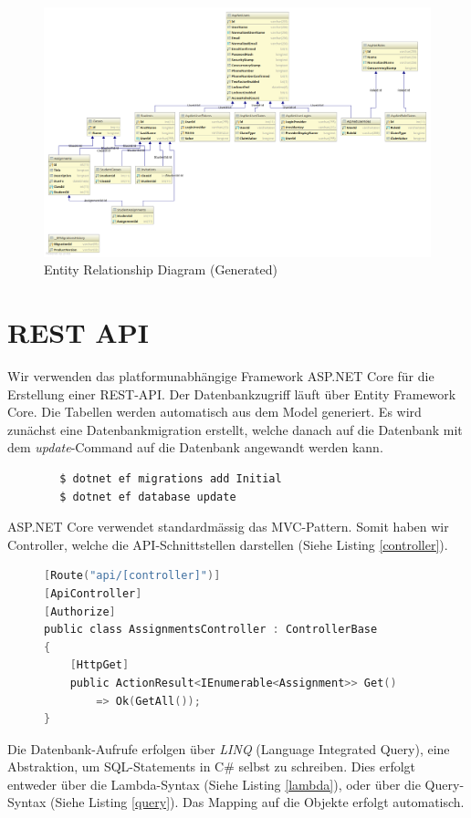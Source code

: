 \documentclass[a4paper, titlepage]{article}
\begin{document}
    \begin{figure}
        \includegraphics[width=\textwidth]{uml2}
        \caption{Entity Relationship Diagram (Generated)}
    \end{figure}

    \section{REST API}
    Wir verwenden das platformunabhängige Framework ASP.NET Core für die Erstellung einer REST-API.
    Der Datenbankzugriff läuft über Entity Framework Core. Die Tabellen werden automatisch aus dem Model
    generiert. Es wird zunächst eine Datenbankmigration erstellt, welche danach auf die Datenbank mit dem
    \emph{update}-Command auf die Datenbank angewandt werden kann.
    \begin{verbatim}
        $ dotnet ef migrations add Initial
        $ dotnet ef database update
    \end{verbatim}
    ASP.NET Core verwendet standardmässig das MVC-Pattern. Somit haben wir Controller, welche die API-Schnittstellen
    darstellen (Siehe Listing \ref{controller}).

    \begin{figure}
    \begin{lstlisting}[caption=Controller, label=controller, language=C]
[Route("api/[controller]")]
[ApiController]
[Authorize]
public class AssignmentsController : ControllerBase
{
    [HttpGet]
    public ActionResult<IEnumerable<Assignment>> Get()
        => Ok(GetAll());
}
    \end{lstlisting}
\end{figure}

    Die Datenbank-Aufrufe erfolgen über \emph{LINQ} (Language Integrated Query), eine Abstraktion, um
    SQL-Statements in C\# selbst zu schreiben. Dies erfolgt entweder über die Lambda-Syntax (Siehe Listing \ref{lambda}), oder über die Query-Syntax
    (Siehe Listing \ref{query}). Das Mapping auf die Objekte erfolgt automatisch.
\end{document}
